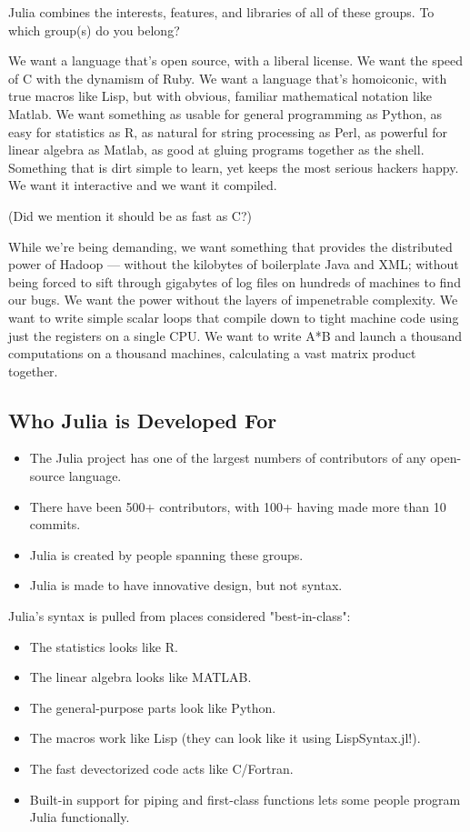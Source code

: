 \documentclass[11pt]{article}
\providecommand{\tightlist}{%
      \setlength{\itemsep}{0pt}\setlength{\parskip}{0pt}}
\begin{document}
Julia combines the interests, features, and libraries of all of these
groups. To which group(s) do you belong?

    We want a language that's open source, with a liberal license. We want
the speed of C with the dynamism of Ruby. We want a language that's
homoiconic, with true macros like Lisp, but with obvious, familiar
mathematical notation like Matlab. We want something as usable for
general programming as Python, as easy for statistics as R, as natural
for string processing as Perl, as powerful for linear algebra as Matlab,
as good at gluing programs together as the shell. Something that is dirt
simple to learn, yet keeps the most serious hackers happy. We want it
interactive and we want it compiled.

(Did we mention it should be as fast as C?)

While we're being demanding, we want something that provides the
distributed power of Hadoop --- without the kilobytes of boilerplate
Java and XML; without being forced to sift through gigabytes of log
files on hundreds of machines to find our bugs. We want the power
without the layers of impenetrable complexity. We want to write simple
scalar loops that compile down to tight machine code using just the
registers on a single CPU. We want to write A*B and launch a thousand
computations on a thousand machines, calculating a vast matrix product
together.

    \subsection{Who Julia is Developed
For}\label{who-julia-is-developed-for}

\begin{itemize}
\tightlist
\item
  The Julia project has one of the largest numbers of contributors of
  any open-source language.
\item
  There have been 500+ contributors, with 100+ having made more than 10
  commits.
\item
  Julia is created by people spanning these groups.
\item
  Julia is made to have innovative design, but not syntax.
\end{itemize}

Julia's syntax is pulled from places considered "best-in-class":

\begin{itemize}
\tightlist
\item
  The statistics looks like R.
\item
  The linear algebra looks like MATLAB.
\item
  The general-purpose parts look like Python.
\item
  The macros work like Lisp (they can look like it using
  LispSyntax.jl!).
\item
  The fast devectorized code acts like C/Fortran.
\item
  Built-in support for piping and first-class functions lets some people
  program Julia functionally.
\end{itemize}
\end{document}
